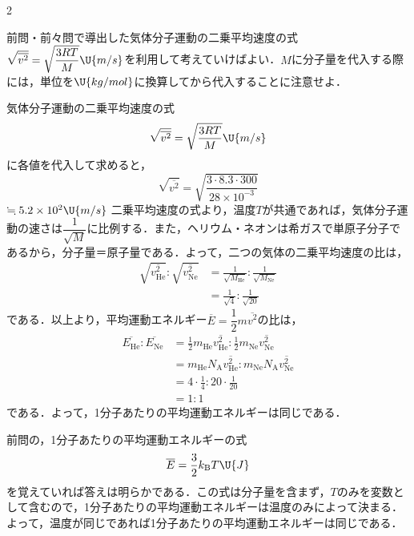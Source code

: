 \begin{multicols}{2}
\par\nopagebreak
\begin{sisin}
前問・前々問で導出した気体分子運動の二乗平均速度の式$\sqrt{\overline{v^2}}=\sqrt{\dfrac{3RT}{M}}\U{m/s}$を利用して考えていけばよい．$M$に分子量を代入する際には，単位を$\U{kg/mol}$に換算してから代入することに注意せよ．
\end{sisin}
\KaiHead
\begin{komon}
 気体分子運動の二乗平均速度の式
       \[\sqrt{\overline{v^2}}=\sqrt{\frac{3RT}{M}}\U{m/s}\]
       に各値を代入して求めると，
       \[\sqrt{\overline{v^2}}=\sqrt{\frac{3\cdot 8.3\cdot 300}{28\times 10^{-3}}}\]
       \hspace*{2zw}$\fallingdotseq 5.2\times 10^2\U{m/s}$\Ans
{} 二乗平均速度の式より，温度$T$が共通であれば，気体分子運動の速さは$\dfrac{1}{\sqrt{M}}$に比例する．また，ヘリウム・ネオンは希ガスで単原子分子であるから，分子量＝原子量である．よって，二つの気体の二乗平均速度の比は，
       \[\begin{aligned}
         \sqrt{\overline{v_{\mathrm{He}}^2}}:\sqrt{\overline{v_{\mathrm{Ne}}^2}}
         &=\frac{1}{\sqrt{M_{\mathrm{He}}}}:\frac{1}{\sqrt{M_{\mathrm{Ne}}}}\\[1mm]
         &=\frac{1}{\sqrt{4}}:\frac{1}{\sqrt{20}}
       \end{aligned}\]
       である．以上より，平均運動エネルギー$\overline{E}=\dfrac{1}{2}m\overline{v^2}$の比は，
       \[\begin{aligned}
         \overline{E_{\mathrm{He}}}:\overline{E_{\mathrm{Ne}}}
         &=\frac{1}{2}m_{\mathrm{He}}\overline{v_{\mathrm{He}}^2}:\frac{1}{2}m_{\mathrm{Ne}}\overline{v_{\mathrm{Ne}}^2}\\[1mm]
         &=m_{\mathrm{He}}N_{\mathrm{A}}\overline{v_{\mathrm{He}}^2}:m_{\mathrm{Ne}}N_{\mathrm{A}}\overline{v_{\mathrm{Ne}}^2}\\[1mm]
         &=4\cdot\frac{1}{4}:20\cdot\frac{1}{20}\\[1mm]
         &=1:1
       \end{aligned}\]
       である．よって，1分子あたりの平均運動エネルギーは同じである．\Ans
\end{komon}
\begin{bekkai}
前問の，1分子あたりの平均運動エネルギーの式
\[\overline{E}=\frac{3}{2}k_{\mathrm{B}}T\U{J}\]
を覚えていれば答えは明らかである．この式は分子量を含まず，$T$のみを変数として含むので，1分子あたりの平均運動エネルギーは温度のみによって決まる．よって，温度が同じであれば1分子あたりの平均運動エネルギーは同じである．\par

\end{bekkai}
\end{multicols}
